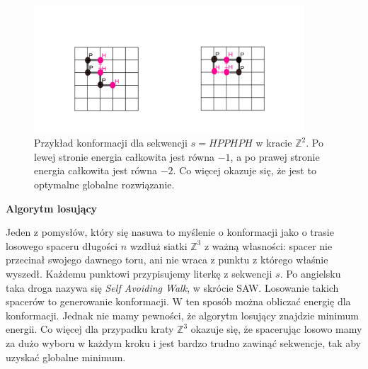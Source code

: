 \documentclass[leqno,10pt]{article}
\begin{document}
\begin{figure}[!htbp]
    \centering
    \includegraphics[width=0.9\textwidth]{diagram.png}
    \caption{Przykład konformacji dla sekwencji $s={HPPHPH}$ w kracie $\mathbb{Z}^{2}$. Po lewej stronie energia całkowita jest równa $-1$, a po prawej stronie energia całkowita jest równa $-2$. Co więcej okazuje się, że jest to optymalne globalne rozwiązanie. }
\end{figure}


\textbf{Algorytm losujący}

Jeden z pomysłów, który się nasuwa to myślenie o konformacji jako o trasie losowego spaceru długości $n$ wzdłuż siatki $\mathbb{Z}^{3}$ z ważną własności: spacer nie przecinał swojego dawnego toru, ani nie wraca z punktu z którego właśnie wyszedł. Każdemu punktowi przypisujemy literkę z sekwencji $s$. Po angielsku taka droga nazywa się \textit{Self Avoiding Walk}, w skrócie SAW. Losowanie takich spacerów to generowanie konformacji. W ten sposób można obliczać energię dla konformacji. Jednak nie mamy pewności, że algorytm losujący znajdzie minimum energii. Co więcej dla przypadku kraty $\mathbb{Z}^3$ okazuje się, że spacerując losowo mamy za dużo wyboru w każdym kroku i jest bardzo trudno zawinąć sekwencje, tak aby uzyskać globalne minimum. 
\end{document}
